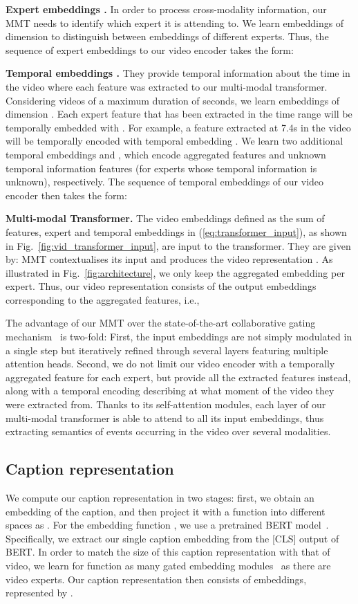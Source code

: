 \documentclass[runningheads]{llncs}
\begin{document}
\noindent\textbf{Expert embeddings .}
In order to process cross-modality information, our MMT needs to identify which expert it is attending to. We learn  embeddings  of dimension  to distinguish between embeddings of different experts. Thus, the sequence of expert embeddings to our video encoder takes the form:


\noindent\textbf{Temporal embeddings .} They provide temporal information about the time in the video where each feature was extracted to our multi-modal transformer. Considering videos of a maximum duration of  seconds, we learn  embeddings  of dimension . Each expert feature that has been extracted in the time range  will be temporally embedded with . For example, a feature extracted at 7.4s in the video will be temporally encoded with temporal embedding . We learn two additional temporal embeddings  and , which encode aggregated features and unknown temporal information features (for experts whose temporal information is unknown), respectively. The sequence of temporal embeddings of our video encoder then takes the form:


\noindent\textbf{Multi-modal Transformer.}
The video embeddings  defined as the sum of features, expert and temporal embeddings in (\ref{eq:transformer_input}), as shown in Fig.~\ref{fig:vid_transformer_input}, are input to the transformer. They are given by:  MMT contextualises its input  and produces the video representation . As illustrated in Fig.~\ref{fig:architecture}, we only keep the aggregated embedding per expert. Thus, our video representation  consists of the output embeddings corresponding to the aggregated features, i.e.,


The advantage of our MMT over the state-of-the-art collaborative gating mechanism~\cite{liu2019use} is two-fold: First, the input embeddings are not simply modulated in a single step but iteratively refined through several layers featuring multiple attention heads. Second, we do not limit our video encoder with a temporally aggregated feature for each expert, but provide all the extracted features instead, along with a temporal encoding describing at what moment of the video they were extracted from. Thanks to its self-attention modules, each layer of our multi-modal transformer is able to attend to all its input embeddings, thus extracting semantics of events occurring in the video over several modalities.

\subsection{Caption representation}
\label{sec:captionrep}
We compute our caption representation  in two stages: first, we obtain an embedding  of the caption, and then project it with a function  into  different spaces as . For the embedding function , we use a pretrained BERT model~\cite{devlin2018bert}. Specifically, we extract our single caption embedding  from the [CLS] output of BERT. In order to match the size of this caption representation with that of video, we learn for function  as many gated embedding modules~\cite{miech2018learning} as there are video experts. Our caption representation then consists of  embeddings, represented by .
\end{document}
